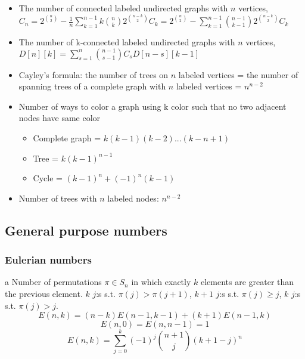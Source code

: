 {\begin{itemize}[leftmargin=*, noitemsep]
  \item The number of connected labeled undirected graphs with \( n \) vertices, \( C_n = 2^{\binom{n}{2}} - \frac{1}{n} \sum_{k = 1}^{n - 1} k \binom{n}{k} 2^{\binom{n-k}{2}}C_k = 2^{\binom{n}{2}} - \sum_{k = 1}^{n - 1} \binom{n - 1}{k - 1} 2^{\binom{n-k}{2}}C_k \)

  \item The number of k-connected labeled undirected graphs with \( n \) vertices, \( D[n][k] = \sum_{s = 1}^{n} \binom{n - 1}{s- 1}C_s D[n - s][k - 1] \)

  \item Cayley's formula: the number of trees on \( n \) labeled vertices = the number of spanning trees of a complete graph with \( n \) labeled vertices = \( n^{n - 2} \)

  \item Number of ways to color a graph using k color such that no two adjacent nodes have same color

    \begin{itemize}[leftmargin=*, noitemsep]
      \item Complete graph = \( k(k-1)(k-2)...(k-n+1) \)
      \item Tree = \( k(k - 1)^{n - 1} \)
      \item Cycle = \( (k - 1)^n + (-1)^n (k - 1) \)
    \end{itemize}

  \item Number of trees with $ n $ labeled nodes: $ n^{n - 2} $
\end{itemize}

\subsection{General purpose numbers}
  \subsubsection{Eulerian numbers}a
    Number of permutations $\pi \in S_n$ in which exactly $k$ elements are greater than the previous element. $k$ $j$:s s.t. $\pi(j)>\pi(j+1)$, $k+1$ $j$:s s.t. $\pi(j)\geq j$, $k$ $j$:s s.t. $\pi(j)>j$.
    $$E(n,k) = (n-k)E(n-1,k-1) + (k+1)E(n-1,k)$$
    $$E(n,0) = E(n,n-1) = 1$$
    $$E(n,k) = \sum_{j=0}^k(-1)^j\binom{n+1}{j}(k+1-j)^n$$

    


}
